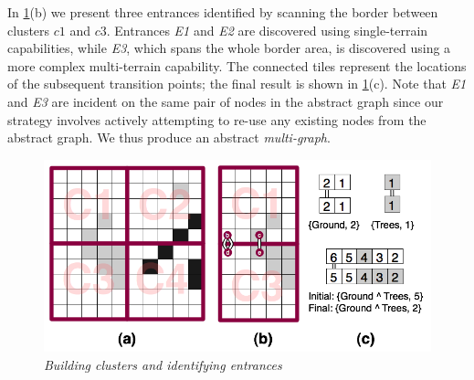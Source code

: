 {In \ref{aha-fig:clustersandentrances}(b) we present three entrances identified by scanning the border between clusters $c1$ and $c3$.
Entrances \emph{E1} and \emph{E2} are discovered using single-terrain capabilities, while \emph{E3}, which spans the whole border area, is discovered using a more complex multi-terrain capability. 
The connected tiles represent the locations of the subsequent transition points; the final result is shown in \ref{aha-fig:clustersandentrances}(c). 
Note that \emph{E1} and \emph{E3} are incident on the same pair of nodes in the abstract graph since our strategy involves actively attempting to re-use any existing nodes from the abstract graph. 
We thus produce an abstract \emph{multi-graph}.

\begin{figure}[htbp]
        \caption{\emph{Building clusters and identifying entrances} }
        \begin{center}
                        \includegraphics[scale=0.25]{diagrams/identifying_entrances.png}
        \end{center}
        \label{aha-fig:clustersandentrances}
\end{figure}

}
